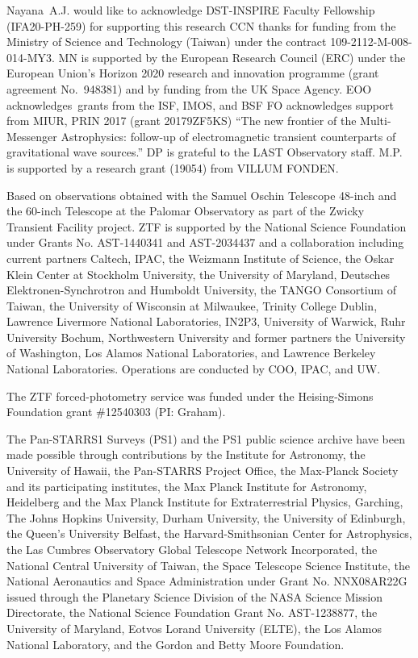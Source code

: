 \documentclass{nature_plusfigure}
\begin{document}
\begin{addendum}
Nayana A.J. would like to acknowledge DST-INSPIRE Faculty Fellowship (IFA20-PH-259) for supporting this research
CCN thanks for funding from the Ministry of Science and Technology (Taiwan) under the contract 109-2112-M-008-014-MY3.
MN is supported by the European Research Council (ERC) under the European Union’s Horizon 2020 research and innovation programme (grant agreement No.~948381) and by funding from the UK Space Agency.
EOO acknowledges grants from the ISF, IMOS, and BSF
FO acknowledges support from MIUR, PRIN 2017 (grant 20179ZF5KS) ``The new frontier of the Multi-Messenger Astrophysics: follow-up of electromagnetic transient counterparts of gravitational wave sources.''
DP is grateful to the LAST Observatory staff.
M.P. is supported by a research grant (19054) from VILLUM FONDEN.

Based on observations obtained with the Samuel Oschin Telescope 48-inch and the 60-inch Telescope at the Palomar Observatory as part of the Zwicky Transient Facility project. ZTF is supported by the National Science Foundation under Grants No. AST-1440341 and AST-2034437 and a collaboration including current partners Caltech, IPAC, the Weizmann Institute of Science, the Oskar Klein Center at Stockholm University, the University of Maryland, Deutsches Elektronen-Synchrotron and Humboldt University, the TANGO Consortium of Taiwan, the University of Wisconsin at Milwaukee, Trinity College Dublin, Lawrence Livermore National Laboratories, IN2P3, University of Warwick, Ruhr University Bochum, Northwestern University and former partners the University of Washington, Los Alamos National Laboratories, and Lawrence Berkeley National Laboratories. Operations are conducted by COO, IPAC, and UW.

The ZTF forced-photometry service was funded under the Heising-Simons Foundation grant \#12540303 (PI: Graham).

The Pan-STARRS1 Surveys (PS1) and the PS1 public science archive have been made possible through contributions by the Institute for Astronomy, the University of Hawaii, the Pan-STARRS Project Office, the Max-Planck Society and its participating institutes, the Max Planck Institute for Astronomy, Heidelberg and the Max Planck Institute for Extraterrestrial Physics, Garching, The Johns Hopkins University, Durham University, the University of Edinburgh, the Queen's University Belfast, the Harvard-Smithsonian Center for Astrophysics, the Las Cumbres Observatory Global Telescope Network Incorporated, the National Central University of Taiwan, the Space Telescope Science Institute, the National Aeronautics and Space Administration under Grant No. NNX08AR22G issued through the Planetary Science Division of the NASA Science Mission Directorate, the National Science Foundation Grant No. AST-1238877, the University of Maryland, Eotvos Lorand University (ELTE), the Los Alamos National Laboratory, and the Gordon and Betty Moore Foundation.


\end{addendum}
\end{document}
